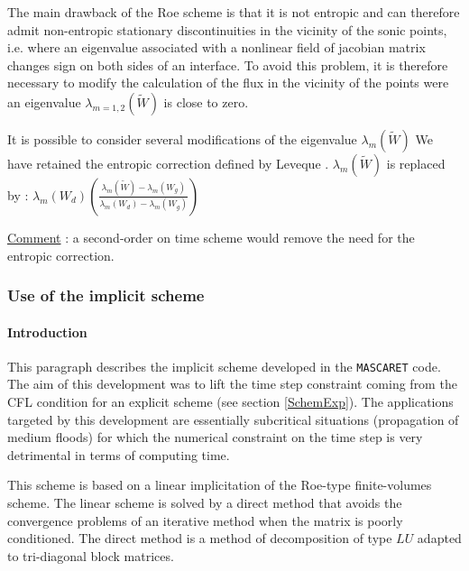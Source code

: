 \hspace*{1cm}

The main drawback of the Roe scheme is that it is not entropic and can therefore admit non-entropic stationary discontinuities in the vicinity of the sonic points, i.e. where an eigenvalue associated with a nonlinear field of jacobian matrix changes sign on both sides of an interface. To avoid this problem, it is therefore necessary to modify the calculation of the flux in the vicinity of the points were an eigenvalue $\lambda_{m=1,2} (\tilde W )$ is close to zero.

\vspace{0.5cm}

It is possible to consider several modifications of the eigenvalue $\lambda_{m} (\tilde W )$ We have retained the entropic correction defined by Leveque \cite{LEVEQUE90}. $\lambda_{m} (\tilde W )$ is replaced by : $\lambda_m (W_d) \left ( \frac{\lambda_m (\tilde W) - \lambda_m (W_g)}{\lambda_m (W_d) - \lambda_m (W_g)}\right )$

\vspace{0.5cm}

\underline{Comment} : a second-order on time scheme would remove the need for the entropic correction.

\subsubsection{Use of the implicit scheme}

\paragraph{Introduction\\}

\hspace*{1cm}

This paragraph describes the implicit scheme developed in the \texttt{MASCARET} code. The aim of this development was to lift the time step constraint coming from the CFL condition for an explicit scheme (see section  \ref{SchemExp}). The applications targeted by this development are essentially subcritical situations (propagation of medium floods) for which the numerical constraint on the time step is very detrimental in terms of computing time.

\vspace{0.5cm}

This scheme is based on a linear implicitation of the Roe-type finite-volumes scheme. The linear scheme is solved by a direct method that avoids the convergence problems of an iterative method when the matrix is poorly conditioned. The direct method is a method of decomposition of type $LU$ adapted to tri-diagonal block matrices.

